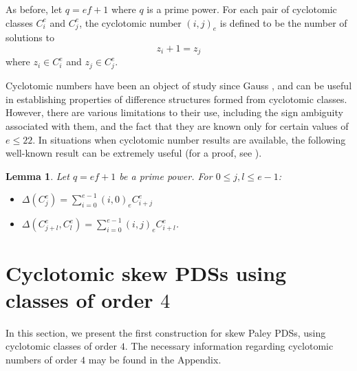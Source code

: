 \documentclass[12pt, a4paper]{article}
\newtheorem{lemma}[theorem]{Lemma}
\theoremstyle{definition}
\begin{document}
As before, let $q=ef+1$ where $q$ is a prime power.  For each pair of cyclotomic classes $C_i^e$ and $C_j^e$, the cyclotomic number $(i,j)_e$ is defined to be the number of solutions to 
$$ z_i+1=z_j$$
where $z_i \in C_i^e$ and $z_j \in C_j^e$.

Cyclotomic numbers have been an object of study since Gauss \cite{Gau}, and can be useful in establishing properties of difference structures formed from cyclotomic classes. However, there are various limitations to their use, including the sign ambiguity associated with them, and the fact that they are known only for certain values of $e \leq 22$. In situations when cyclotomic number results are available, the following well-known result can be extremely useful (for a proof, see \cite{HucJoh}). 

\begin{lemma}\label{lemma:cyc}
Let $q=ef+1$ be a prime power.  For $0 \leq j,l \leq e-1$:
\begin{itemize}
\item[(i)] $\Delta(C_j^e)=\sum_{i=0}^{e-1} (i,0)_e C_{i+j}^e$
\item[(ii)] $\Delta(C_{j+l}^e,C_l^e)=\sum_{i=0}^{e-1} (i,j)_e C_{i+l}^e$.
\end{itemize}
\end{lemma}

\section{Cyclotomic skew PDSs using classes of order $4$}

In this section, we present the first construction for skew Paley PDSs, using cyclotomic classes of order $4$.  The necessary information regarding cyclotomic numbers of order $4$ may be found in the Appendix.  
\end{document}
